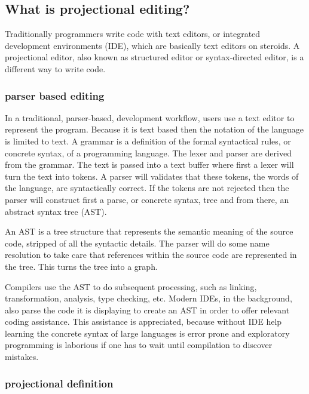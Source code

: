 \subsection{What is projectional editing?}


Traditionally programmers write code with text editors, or integrated development environments (IDE), which are basically text editors on steroids.
A projectional editor, also known as structured editor or syntax-directed editor, is a different way to write code.

\subsubsection{parser based editing}

In a traditional, parser-based, development workflow, users use a text editor to represent the program.
Because it is text based then the notation of the language is limited to text.
A grammar is a definition of the formal syntactical rules, or concrete syntax, of a programming language.
The lexer and parser are derived from the grammar.
The text is passed into a text buffer where first a lexer will turn the text into tokens. 
A parser will validates that these tokens, the words of the language, are syntactically correct.
If the tokens are not rejected then the parser will construct first a parse, or concrete syntax, tree and from there, an abstract syntax tree (AST).

An AST is a tree structure that represents the semantic meaning of the source code, stripped of all the syntactic details.
The parser will do some name resolution to take care that references within the source code are represented in the tree. 
This turns the tree into a graph.

Compilers use the AST to do subsequent processing, such as linking, transformation, analysis, type checking, etc.
Modern IDEs, in the background, also parse the code it is displaying to create an AST in order to offer relevant coding assistance.
This assistance is appreciated, because without IDE help learning the concrete syntax of large languages is error prone and exploratory programming is laborious if one has to wait until compilation to discover mistakes.


\subsubsection{projectional definition}

